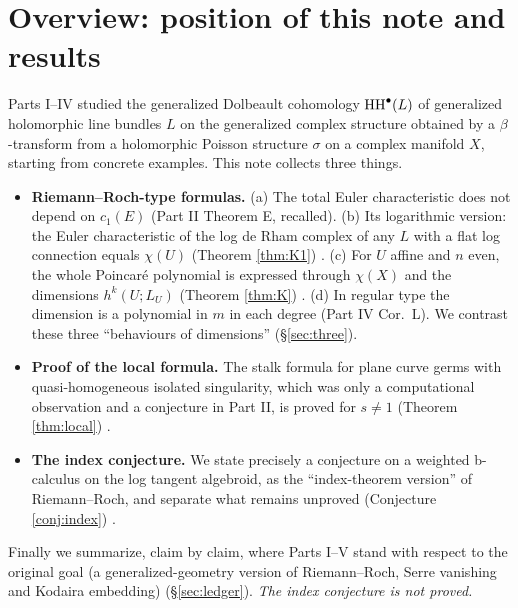 \section{Overview: position of this note and results}
Parts I--IV studied the generalized Dolbeault cohomology $\mathrm{HH}^\bullet(L)$ of generalized holomorphic line bundles $L$ on the generalized complex structure obtained by a $\beta$-transform from a holomorphic Poisson structure $\sigma$ on a complex manifold $X$, starting from concrete examples. This note collects three things.

\begin{itemize}
\item \textbf{Riemann--Roch-type formulas.} (a) The total Euler characteristic does not depend on $c_1(E)$ (Part II Theorem E, recalled). (b) Its logarithmic version: the Euler characteristic of the log de Rham complex of any $L$ with a flat log connection equals $\chi(U)$ (Theorem \ref{thm:K1}) \tP. (c) For $U$ affine and $n$ even, the whole Poincar\'e polynomial is expressed through $\chi(X)$ and the dimensions $h^k(U;L_U)$ (Theorem \ref{thm:K}) \tP\tV. (d) In regular type the dimension is a polynomial in $m$ in each degree (Part IV Cor.\ L). We contrast these three ``behaviours of dimensions'' (\S\ref{sec:three}).
\item \textbf{Proof of the local formula.} The stalk formula for plane curve germs with quasi-homogeneous isolated singularity, which was only a computational observation and a conjecture in Part II, is proved for $s\neq1$ (Theorem \ref{thm:local}) \tP.
\item \textbf{The index conjecture.} We state precisely a conjecture on a weighted b-calculus on the log tangent algebroid, as the ``index-theorem version'' of Riemann--Roch, and separate what remains unproved (Conjecture \ref{conj:index}) \tK.
\end{itemize}
Finally we summarize, claim by claim, where Parts I--V stand with respect to the original goal (a generalized-geometry version of Riemann--Roch, Serre vanishing and Kodaira embedding) (\S\ref{sec:ledger}). \emph{The index conjecture is not proved.}

